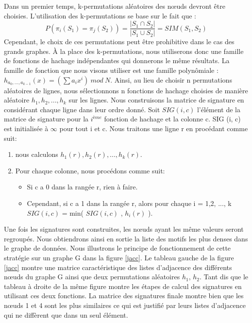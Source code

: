 \documentclass[a4paper,oneside,12pt]{report}
\theoremstyle{definition}
\begin{document}
\begin{enumerate}
Dans un premier temps, k-permutations aléatoires des nœuds devront être choisies. L'utilisation des k-permutations se base sur le fait que :
\begin{equation} \label{eq:prob}
P(\pi_i(S_1) = \pi_j(S_2)) = \frac{|S_1 \cap S_2|}{|S_1 \cup S_2|} = SIM(S_1,S_2)
\end{equation}
Cependant, le choix de ces permutations peut être prohibitive dans le cas des grands graphes.
À la place des k-permutations, nous utiliserons donc une famille de fonctions de hachage indépendantes qui donnerons le même résultats. La famille de fonction que nous visons utiliser est une famille polynômiale : $h_{a_0, ..., a_{k-1}}(x)= (\sum a_i x^i)\ mod\ N$. Ainsi, au lieu de choisir n permutations aléatoires de lignes, nous sélectionnons n fonctions de hachage choisies de manière aléatoire $h_1, h_2,. . . , h_k$ sur les lignes. Nous construisons la matrice de signature en considérant chaque ligne dans leur ordre donné. Soit $SIG (i, c)$ l'élément de la matrice de signature pour la $i^{ème}$ fonction de hachage et la colonne c. SIG (i, c) est initialisée à $\infty$ pour tout i et c. Nous traitons une ligne r en procédant comme suit:
\begin{enumerate}
\item nous calculons $h_1 (r), h_2 (r), ..., h_k (r)$.
\item Pour chaque colonne, nous procédons comme suit: 
	\begin{itemize}
		\item  Si c a 0 dans la rangée r, rien à faire.
		\item  Cependant, si c a 1 dans la rangée r, alors pour chaque i = 1,2, ..., k  \\$SIG (i, c)$ = min( $SIG (i, c)$ , $h_i(r)$ ).
	\end{itemize}
\end{enumerate}


\end{enumerate}

Une fois les signatures sont construites, les nœuds ayant les même valeurs seront regroupés. Nous obtiendrons ainsi en sortie la liste des motifs les plus denses dans le graphe de données. Nous illustrons le principe de fonctionnement de cette stratégie sur un graphe G dans la figure \ref{jacc}. Le tableau gauche de la figure \ref{jacc} montre une matrice caractéristique des listes d'adjacence des différents nœuds du graphe G ainsi que deux permutations aléatoires $h_1$, $h_2$. Tant dis que le tableau à droite de la même figure montre les étapes de calcul des signatures en utilisant ces deux fonctions. La matrice des signatures finale montre bien que les nœuds 1 et 4 sont les plus similaires ce qui est justifié par leurs listes d'adjacence qui ne diffèrent que dans un seul élément.  
\end{document}

